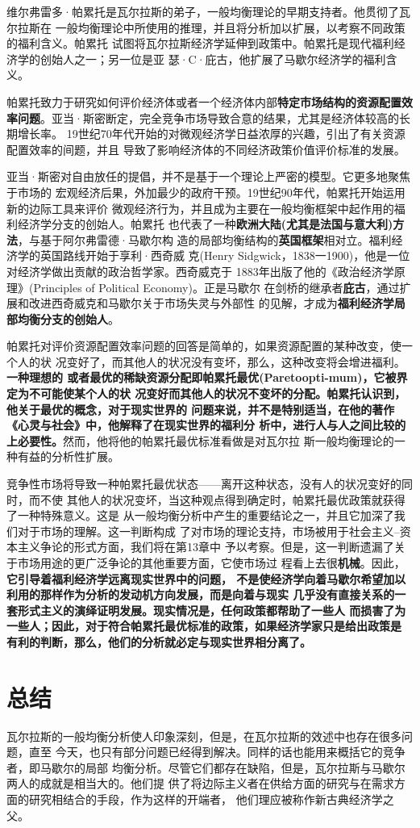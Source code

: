 维尔弗雷多·帕累托是瓦尔拉斯的弟子，一般均衡理论的早期支持者。他贯彻了瓦尔拉斯在
一般均衡理论中所使用的推理，并且将分析加以扩展，以考察不同政策的福利含义。帕累托
试图将瓦尔拉斯经济学延伸到政策中。帕累托是现代福利经济学的创始人之一；另一位是亚
瑟·C·庇古，他扩展了马歇尔经济学的福利含义。

帕累托致力于研究如何评价经济体或者一个经济体内部\textbf{特定市场结构的资源配置效
率问题}。亚当·斯密断定，完全竞争市场导致合意的结果，尤其是经济体较高的长期增长率。
19世纪70年代开始的对微观经济学日益浓厚的兴趣，引出了有关资源配置效率的间题，并且
导致了影响经济体的不同经济政策价值评价标准的发展。

亚当·斯密对自由放任的提倡，并不是基于一个理论上严密的模型。它更多地聚焦于市场的
宏观经济后果，外加最少的政府干预。19世纪90年代，帕累托开始运用新的边际工具来评价
微观经济行为，并且成为主要在一般均衡框架中起作用的福利经济学分支的创始人。帕累托
也代表了一种\textbf{欧洲大陆(尤其是法国与意大利)方法}，与基于阿尔弗雷德·马歇尔构
造的局部均衡结构的\textbf{英国框架}相对立。福利经济学的英国路线开始于享利·西奇威
克(Henry Sidgwick，1838一1900)，他是一位对经济学做出贡献的政治哲学家。西奇威克于
1883年出版了他的《政治经济学原理》(Principles of Political Economy)。正是马歇尔
在剑桥的继承者\textbf{庇古}，通过扩展和改进西奇威克和马歇尔关于市场失灵与外部性
的见解，才成为\textbf{福利经济学局部均衡分支的创始人}。

帕累托对评价资源配置效率问题的回答是简单的，如果资源配置的某种改变，使一个人的状
况变好了，而其他人的状况没有变坏，那么，这种改变将会增进福利。\textbf{一种理想的
或者最优的稀缺资源分配即帕累托最优(Paretoopti-mum)，它被界定为不可能使某个人的状
况变好而其他人的状况不变坏的分配。帕累托认识到，他关于最优的概念，对于现实世界的
问题来说，并不是特别适当，在他的著作《心灵与社会》中，他解释了在现实世界的福利分
析中，进行人与人之间比较的上必要性。}然而，他将他的帕累托最优标准看做是对瓦尔拉
斯一般均衡理论的一种有益的分析性扩展。

竞争性市场将导致一种帕累托最优状态——离开这种状态，没有人的状况变好的同时，而不使
其他人的状况变坏，当这种观点得到确定时，帕累托最优政策就获得了一种特殊意义。这是
从一般均衡分析中产生的重要结论之一，并且它加深了我们对于市场的理解。这一判断构成
了对市场的理论支持，市场被用于社会主义--资本主义争论的形式方面，我们将在第13章中
予以考察。但是，这一判断遗漏了关于市场用途的更广泛争论的其他重要方面，它使市场过
程看上去很\textbf{机械}。因此，\textbf{它引导着福利经济学远离现实世界中的问题，
不是使经济学向着马歇尔希望加以利用的那样作为分析的发动机方向发展，而是向着与现实
几乎没有直接关系的一套形式主义的演绎证明发展。现实情况是，任何政策都帮助了一些人
而损害了为一些人；因此，对于符合帕累托最优标准的政策，如果经济学家只是给出政策是
有利的判断，那么，他们的分析就必定与现实世界相分离了。}

\section{总结}

瓦尔拉斯的一般均衡分析使人印象深刻，但是，在瓦尔拉斯的效述中也存在很多问题，直至
今天，也只有部分问题已经得到解决。同样的话也能用来概括它的竞争者，即马歇尔的局部
均衡分析。尽管它们都存在缺陷，但是，瓦尔拉斯与马歇尔两人的成就是相当大的。他们提
供了将边际主义者在供给方面的研究与在需求方面的研究相结合的手段，作为这样的开端者，
他们理应被称作新古典经济学之父。

